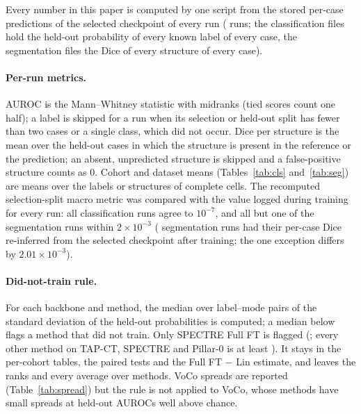 Every number in this paper is computed by one script from the stored per-case predictions of the selected checkpoint of every run (\numRunsAllN{} runs; the classification files hold the held-out probability of every known label of every case, the segmentation files the Dice of every structure of every case).

\paragraph{Per-run metrics.} AUROC is the Mann--Whitney statistic with midranks (tied scores count one half); a label is skipped for a run when its selection or held-out split has fewer than two cases or a single class, which did not occur. Dice per structure is the mean over the held-out cases in which the structure is present in the reference or the prediction; an absent, unpredicted structure is skipped and a false-positive structure counts as 0. Cohort and dataset means (Tables~\ref{tab:cls} and~\ref{tab:seg}) are means over the labels or structures of complete cells. The recomputed selection-split macro metric was compared with the value logged during training for every run: all \numSelcheckClsRunsN{} classification runs agree to $10^{-7}$, and all but one of the \numSelcheckSegRunsN{} segmentation runs within $2\times10^{-3}$ (\numSegrecompRunsN{} segmentation runs had their per-case Dice re-inferred from the selected checkpoint after training; the one exception differs by $2.01\times10^{-3}$).

\paragraph{Did-not-train rule.} For each backbone and method, the median over label--mode pairs of the standard deviation of the held-out probabilities is computed; a median below \numSpreadMinValue{} flags a method that did not train. Only SPECTRE Full FT is flagged (\numSpreadSpectreFullft{}; every other method on TAP-CT, SPECTRE and Pillar-0 is at least \numSpreadOthermin{}). It stays in the per-cohort tables, the paired tests and the Full FT $-$ Lin estimate, and leaves the ranks and every average over methods. VoCo spreads are reported (Table~\ref{tab:spread}) but the rule is not applied to VoCo, whose methods have small spreads at held-out AUROCs well above chance.

